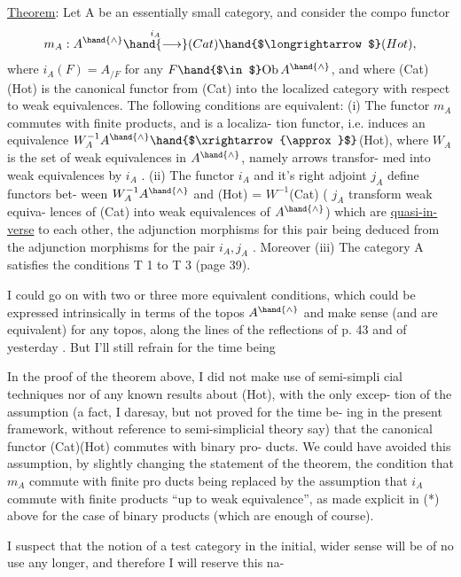
\uline{Theorem}: Let A be an essentially small category, and consider the compo
 functor
\[ m_A : A^{\hand{\wedge}} \overset{i_A}{\hand{\longrightarrow}} (Cat)\hand{$\longrightarrow$}(Hot) , \]
where $i_A(F) = A_{/F}$ for any $F \hand{$\in$} \mathrm{Ob}\, A^{\hand{\wedge}}$, and where (Cat)\hand{$\longrightarrow$}(Hot) is the
canonical functor from (Cat) into the localized category with respect to
weak equivalences. The following conditions are equivalent:
(i) The functor $m_A$ commutes with finite products, and is a localiza-
tion functor, i.e. induces an equivalence $W_A^{-1}A^{\hand{\wedge}} \hand{$\xrightarrow{\approx}$}$(Hot), where
$W_A$ is the set of weak equivalences in $A^{\hand{\wedge}}$, namely arrows transfor-
med into weak equivalences by $i_A$ . 
(ii) The functor $i_A$ and it's right adjoint $j_A$  define functors bet-
ween $W_A^{-1}A^{\hand{\wedge}}$ and (Hot) = $W^{-1}$(Cat) ( $j_A$  transform weak equiva-
lences of (Cat) into weak equivalences of $A^{\hand{\wedge}}$) which are \uline{quasi-in-}%
\uline{verse} to each other, the adjunction morphisms for this pair being
deduced from the adjunction morphisms for the pair $i_A, j_A$ . Moreover
(iii) The category A satisfies the  conditions T 1 to T 3
(page 39).

I could go on with two or three more equivalent conditions, which
could be expressed intrinsically in terms of the topos $A^{\hand{\wedge}}$ and make sense
(and are equivalent) for any topos, along the lines of the reflections of
p. 43 and of yesterday . But I'll still refrain for the time being\hand{!}

In the proof of the theorem above, I did not make use of semi-simpli%
cial techniques nor of any known results about (Hot), with the only excep-%
tion of the assumption (a fact, I daresay, but not proved for the time be-%
ing in the present framework, without reference to semi-simplicial theory
say) that the canonical functor (Cat)\hand{$\longrightarrow$}(Hot) commutes with binary pro-%
ducts. We could have avoided this assumption, by slightly changing the
statement of the theorem, the condition that $m_A$ commute with finite pro\hand{-}%
ducts  being replaced by the assumption that $i_A$ commute with finite products
``up to weak equivalence'', as made explicit in (*) above for the case of
binary products (which are enough of course).

I suspect that the notion of a test category in the initial, wider
sense will be of no use any longer, and therefore I will reserve this na-%
